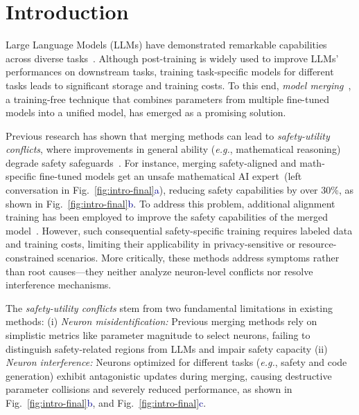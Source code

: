 \section{Introduction}
Large Language Models (LLMs) have demonstrated remarkable capabilities across diverse tasks~\cite{gpt3,gpt4,cai2024internlm2,touvron2023llama2, qwen}. Although post-training is widely used to improve LLMs' performances on downstream tasks, training task-specific models for different tasks leads to significant storage and training costs. To this end, \emph{model merging}~\cite{model_soup,evo_merge,xiao-etal-2024-lm}, a training-free technique that combines parameters from multiple fine-tuned models into a unified model, has emerged as a promising solution. 

Previous research has shown that merging methods can lead to \textit{safety-utility conflicts}, where improvements in general ability (\emph{e.g.}, mathematical reasoning) degrade safety safeguards~\cite{hammoud-etal-2024-model}. For instance, merging safety-aligned and math-specific fine-tuned models get an unsafe mathematical AI expert~(left conversation in Fig.~\ref{fig:intro-final}\textcolor{darkblue}{a}), reducing safety capabilities by over 30\%, as shown in Fig.~\ref{fig:intro-final}\textcolor{darkblue}{b}. To address this problem, additional alignment training has been employed to improve the safety capabilities of the merged model~\cite{safetymerge1,aakanksha2024mix}. However, such consequential safety-specific training requires labeled data and training costs, limiting their applicability in privacy-sensitive or resource-constrained scenarios. More critically, these methods address symptoms rather than root causes—they neither analyze neuron-level conflicts nor resolve interference mechanisms.



The \textit{safety-utility conflicts} stem from two fundamental limitations in existing methods: (i) \emph{Neuron misidentification:} Previous merging methods rely on simplistic metrics like parameter magnitude to select neurons, failing to distinguish safety-related regions from LLMs and impair safety capacity (ii) \emph{Neuron interference:} Neurons optimized for different tasks (\emph{e.g.}, safety and code generation) exhibit antagonistic updates during merging, causing destructive parameter collisions and severely reduced performance, as shown in Fig.~\ref{fig:intro-final}\textcolor{darkblue}{b}, and Fig.~\ref{fig:intro-final}\textcolor{darkblue}{c}.

